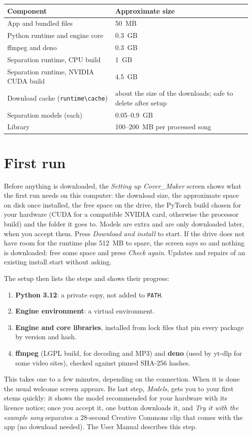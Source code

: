 \documentclass{covermaker}
\begin{document}
\noindent\begin{tabularx}{\linewidth}{@{}lY@{}}
\toprule
\textbf{Component} & \textbf{Approximate size} \\
\midrule
App and bundled files & 50~MB \\
Python runtime and engine core & 0.3~GB \\
ffmpeg and deno & 0.3~GB \\
Separation runtime, CPU build & 1~GB \\
Separation runtime, NVIDIA CUDA build & 4.5~GB \\
Download cache (\texttt{runtime\textbackslash cache}) & about the size of the
downloads; safe to delete after setup \\
Separation models (each) & 0.05--0.9~GB \\
Library & 100--200~MB per processed song \\
\bottomrule
\end{tabularx}

\chapter{First run}
Before anything is downloaded, the \emph{Setting up Cover\_Maker} screen shows
what the first run needs on this computer: the download size, the approximate
space on disk once installed, the free space on the drive, the PyTorch build
chosen for your hardware (CUDA for a compatible NVIDIA card, otherwise the
processor build) and the folder it goes to. Models are extra and are only
downloaded later, when you accept them. Press \emph{Download and install} to
start. If the drive does not have room for the runtime plus 512~MB to spare,
the screen says so and nothing is downloaded: free some space and press
\emph{Check again}. Updates and repairs of an existing install start without
asking.

The setup then lists the steps and shows their progress:
\begin{enumerate}
  \item \textbf{Python 3.12}: a private copy, not added to \texttt{PATH}.
  \item \textbf{Engine environment}: a virtual environment.
  \item \textbf{Engine and core libraries}, installed from lock files that pin
  every package by version and hash.
  \item \textbf{ffmpeg} (LGPL build, for decoding and MP3) and \textbf{deno}
  (used by yt-dlp for some video sites), checked against pinned SHA-256 hashes.
\end{enumerate}
This takes one to a few minutes, depending on the connection. When it is done
the usual welcome screen appears. Its last step, \emph{Models}, gets you to
your first stems quickly: it shows the model recommended for your hardware with
its licence notice; once you accept it, one button downloads it, and
\emph{Try it with the example song} separates a 28-second Creative Commons
clip that comes with the app (no download needed). The User Manual describes
this step.
\end{document}
